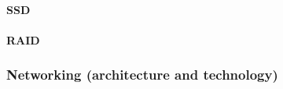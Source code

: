\newpage

\paragraph{SSD}

\paragraph{RAID}

\subsubsection{Networking (architecture and technology)}\label{subsubsection: Networking (architecture and technology)}
